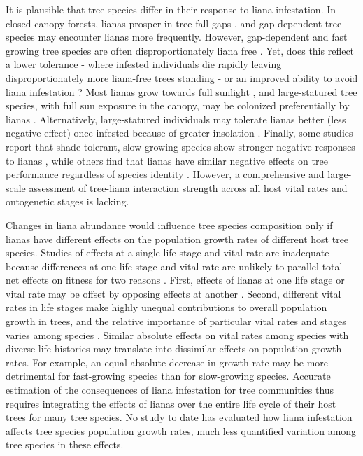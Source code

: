 \documentclass[b5paper,justified]{tufte-book} %
\begin{document}
\begin{fullwidth}
It is plausible that tree species differ in their response to liana infestation. In closed canopy forests, lianas prosper in tree-fall gaps \citep{Schnitzer2000, Ledo2014}, and gap-dependent tree species may encounter lianas more frequently. However, gap-dependent and fast growing tree species are often disproportionately liana free \citep{Clark1990}. Yet, does this reflect a lower tolerance - where infested individuals die rapidly leaving disproportionately more liana-free trees standing - or an improved ability to avoid liana infestation \citep{Putz1984a, Heijden2008, Schnitzer2010}? Most lianas grow towards full sunlight \citep{Putz1984a}, and large-statured tree species, with full sun exposure in the canopy, may be colonized preferentially by lianas \citep{Phillips2005}. Alternatively, large-statured individuals may tolerate lianas better (less negative effect) once infested because of greater insolation \citep{Wright2015}. Finally, some studies report that shade-tolerant, slow-growing species show stronger negative responses to lianas \citep{Schnitzer2010}, while others find that lianas have similar negative effects on tree performance regardless of species identity \citep{Martinez-Izquierdo2016, Schnitzer2005}. However, a comprehensive and large-scale assessment of tree-liana interaction strength across all host vital rates and ontogenetic stages is lacking. 

Changes in liana abundance would influence tree species composition only if lianas have different effects on the population growth rates of different host tree species. Studies of effects at a single life-stage and vital rate are inadequate because differences at one life stage and vital rate are unlikely to parallel total net effects on fitness for two reasons \citep{Caswell1983, Ehrlen2003, Metcalf2007}. First, effects of lianas at one life stage or vital rate may be offset by opposing effects at another \citep{Visser2016}. Second, different vital rates in life stages make highly unequal contributions to overall population growth in trees, and the relative importance of particular vital rates and stages varies among species \citep{DeKroon2000, DeKroon1986}. Similar absolute effects on vital rates among species with diverse life histories may translate into dissimilar effects on population growth rates. For example, an equal absolute decrease in growth rate may be more detrimental for fast-growing species than for slow-growing species. Accurate estimation of the consequences of liana infestation for tree communities thus requires integrating the effects of lianas over the entire life cycle of their host trees for many tree species. No study to date has evaluated how liana infestation affects tree species population growth rates, much less quantified variation among tree species in these effects.


\end{fullwidth}
\end{document}
